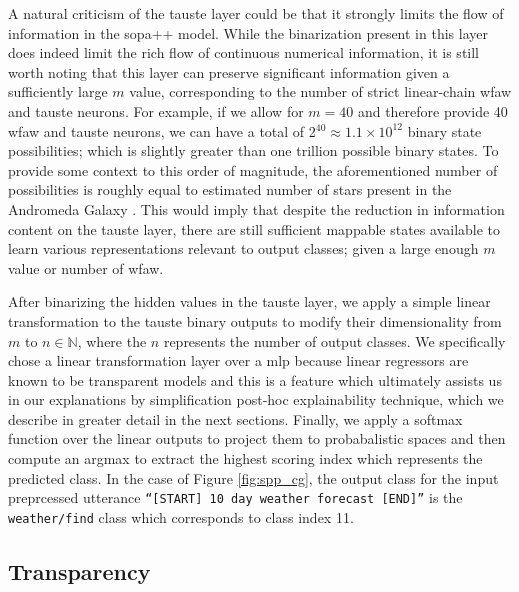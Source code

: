 A natural criticism of the \ac{tauste} layer could be that it strongly limits
the flow of information in the \ac{sopa}++ model. While the binarization present in
this layer does indeed limit the rich flow of continuous numerical information,
it is still worth noting that this layer can preserve significant information
given a sufficiently large $m$ value, corresponding to the number of strict
linear-chain \ac{wfaw} and \ac{tauste} neurons. For example, if we allow for
$m=40$ and therefore provide 40 \ac{wfaw} and \ac{tauste} neurons, we can have a
total of 2$^{40}\approx1.1\times10^{12}$ binary state possibilities; which is
slightly greater than one trillion possible binary states. To provide some
context to this order of magnitude, the aforementioned number of possibilities
is roughly equal to estimated number of stars present in the Andromeda Galaxy
\citep{10.1093/mnras/stu879}. This would imply that despite the reduction in
information content on the \ac{tauste} layer, there are still sufficient
mappable states available to learn various representations relevant to output
classes; given a large enough $m$ value or number of \ac{wfaw}.

After binarizing the hidden values in the \ac{tauste} layer, we apply a simple linear
transformation to the \ac{tauste} binary outputs to modify their dimensionality from
$m$ to $n \in \mathbb{N}$, where the $n$ represents the number of output
classes. We specifically chose a linear transformation layer over a \ac{mlp} because
linear regressors are known to be transparent models
\citep{arrieta2020explainable} and this is a feature which ultimately assists us
in our explanations by simplification post-hoc explainability technique, which
we describe in greater detail in the next sections. Finally, we apply a softmax
function over the linear outputs to project them to probabalistic spaces and
then compute an argmax to extract the highest scoring index which represents the
predicted class. In the case of Figure \ref{fig:spp_cg}, the output class for
the input preprcessed utterance \texttt{``[START] 10 day weather forecast
  [END]''} is the \texttt{weather/find} class which corresponds to class index 11.

\subsection{Transparency}

\label{section:spp_transparency}


